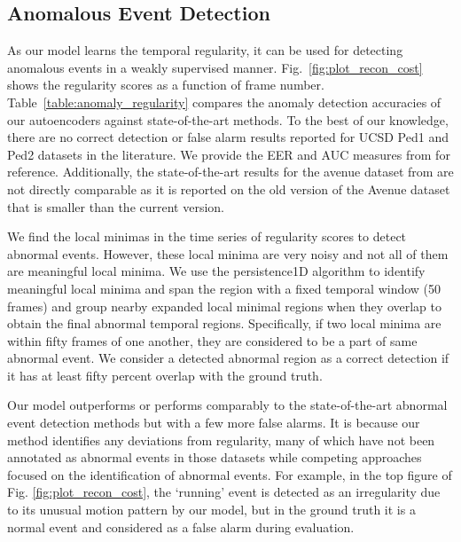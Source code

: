 \documentclass[10pt,twocolumn,letterpaper]{article}
\begin{document}
\subsection{Anomalous Event Detection}

As our model learns the temporal regularity, it can be used for detecting anomalous events in a weakly supervised manner.
Fig.~\ref{fig:plot_recon_cost} shows the regularity scores as a function of frame number.
Table~\ref{table:anomaly_regularity} compares the anomaly detection accuracies of our autoencoders against state-of-the-art methods.
To the best of our knowledge, there are no correct detection or false alarm results reported for UCSD Ped1 and Ped2 datasets in the literature. 
We provide the EER and AUC measures from \cite{saligramaC12} for reference.
Additionally, the state-of-the-art results for the avenue dataset from \cite{lu2013abnormal} are not directly comparable as it is reported on the old version of the Avenue dataset that is smaller than the current version.

We find the local minimas in the time series of regularity scores to detect abnormal events. However, these local minima are very noisy and not all of them are meaningful local minima.
We use the persistence1D \cite{persistence1D} algorithm to identify meaningful local minima and span the region with a fixed temporal window (50 frames) and group nearby expanded local minimal regions when they overlap to obtain the final abnormal temporal regions. 
Specifically, if two local minima are within fifty frames of one another, they are considered to be a part of same abnormal event. 
We consider a detected abnormal region as a correct detection if it has at least fifty percent overlap with the ground truth.

Our model outperforms or performs comparably to the state-of-the-art abnormal event detection methods but with a few more false alarms.
It is because our method identifies any deviations from regularity, many of which have not been annotated as abnormal events in those datasets while competing approaches focused on the identification of abnormal events.
For example, in the top figure of Fig. \ref{fig:plot_recon_cost}, the `running' event is detected as an irregularity due to its unusual motion pattern by our model, but in the ground truth it is a normal event and considered as a false alarm during evaluation.
\end{document}
